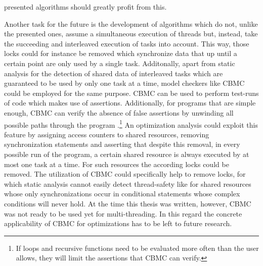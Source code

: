 presented algorithms should greatly profit from this.

Another task for the future is the development of algorithms which do not, unlike the presented ones, assume a simultaneous execution of threads but, instead, take the succeeding and interleaved execution of tasks into account. This way, those locks could for instance be removed which synchronize data that up until a certain point are only used by a single task. Additonally, apart from static analysis for the detection of shared data of interleaved tasks which are guaranteed to be used by only one task at a time, model checkers like CBMC could be employed for the same purpose. CBMC can be used to perform test-runs of code which makes use of assertions. Additionally, for programs that are simple enough, CBMC can verify the absence of false assertions by unwinding all possible paths through the program \cite{CBMCTutorial}.\footnote{If loops and recursive functions need to be evaluated more often than the user allows, they will limit the assertions that CBMC can verify.} An optimization analysis could exploit this feature by assigning access counters to shared resources, removing synchronization statements and asserting that despite this removal, in every possible run of the program, a certain shared resource is always executed by at most one task at a time. For such resources the according locks could be removed. The utilization of CBMC could specifically help to remove locks, for which static analysis cannot easily detect thread-safety like for shared resources whose only synchronizations occur in conditional statements whose complex conditions will never hold. At the time this thesis was written, however, CBMC was not ready to be used yet for multi-threading. In this regard the concrete applicability of CBMC for optimizations has to be left to future research.

